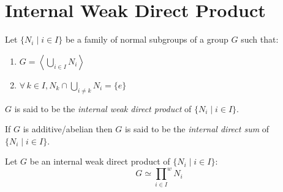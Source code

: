 \documentclass[letterpaper,12pt,fleqn]{article}
\newcommand{\nfam}{\{N_i\mid i\in I\}}
\newcommand{\cycle}[1]{\left<#1\right>}
\newcommand{\nweak}{{\prod_{i\in I}}^wN_i}
\begin{document}
\section*{Internal Weak Direct Product}

\begin{definition}
  Let $\nfam$ be a family of normal subgroups of a group $G$ such that:
  \begin{enumerate}
  \item $G=\cycle{\bigcup_{i\in I}N_i}$
  \item $\forall\,k\in I,N_k\cap\bigcup_{i\ne k}N_i=\{e\}$
  \end{enumerate}
  $G$ is said to be the \emph{internal weak direct product} of $\nfam$.

  If $G$ is additive/abelian then $G$ is said to be the
  \emph{internal direct sum} of $\nfam$.
\end{definition}

\begin{theorem}
  Let $G$ be an internal weak direct product of $\nfam$:
  \[G\simeq\nweak\]
\end{theorem}
\end{document}
